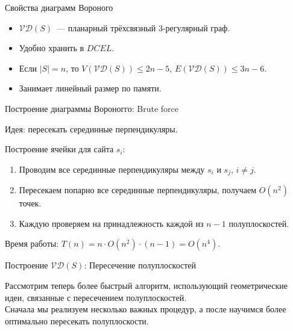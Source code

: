 \documentclass[12pt,aspectratio=169,svgnames]{beamer}
\begin{document}
    \begin{frame}{Свойства диаграмм Вороного}

        \begin{itemize}

            \item $\mathcal{V}\mathcal{D}(S)$~--- планарный трёхсвязный 3-регулярный граф.

            \item Удобно хранить в $DCEL$.

            \item Если $|S| = n$, то $V(\mathcal{V}\mathcal{D}(S)) \le 2n - 5$, $E(\mathcal{V}\mathcal{D}(S)) \le 3n - 6$.

            \item Занимает линейный размер по памяти.

        \end{itemize}
    \end{frame}

    \begin{frame}{Построение диаграммы Вороногго: Brute force}

        \alert{Идея:} пересекать серединные перпендикуляры.

        Построение ячейки для сайта $s_i$:

        \begin{enumerate}
            \item Проводим все серединные перпендикуляры между $s_i$ и $s_j$, $i \neq j$.

            \item Пересекаем попарно все серединные перпендикуляры, получаем $O(n^2)$ точек.

            \item Каждую проверяем на принадлежность каждой из $n - 1$ полуплоскостей.

        \end{enumerate}

        Время работы: $T(n) = n \cdot O(n^2) \cdot (n - 1) = O(n^4)$.

    \end{frame}

    \begin{frame}{Построение $\mathcal{V}\mathcal{D}(S)$: Пересечение полуплоскостей}

        Рассмотрим теперь более быстрый алгоритм, использующий геометрические идеи, связанные с пересечением полуплоскостей. \\

        Сначала мы реализуем несколько важных процедур, а после научимся более оптимально пересекать полуплоскости.

    \end{frame}
\end{document}
